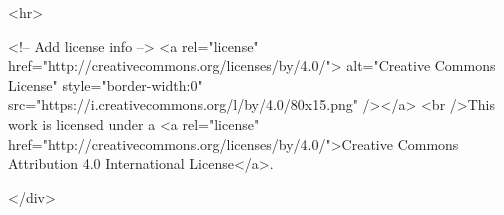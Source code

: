 \documentclass[
]{book}
\begin{document}
<hr>



<!-- Add license info -->
<a rel="license" href="http://creativecommons.org/licenses/by/4.0/"> alt="Creative Commons License" style="border-width:0" src="https://i.creativecommons.org/l/by/4.0/80x15.png" /></a>
<br />This work is licensed under a <a rel="license" href="http://creativecommons.org/licenses/by/4.0/">Creative Commons Attribution 4.0 International License</a>.




</div>
\end{document}
